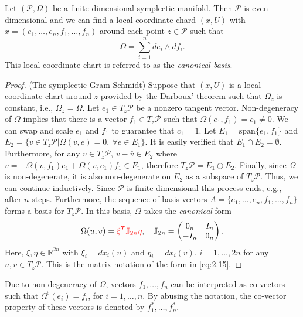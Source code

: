 \begin{corollary} \label{theorem:2.7}
Let $(\mathcal P, \Omega)$ be a finite-dimensional symplectic manifold. Then $\mathcal P$ is even dimensional and we can find a local coordinate chard $(x,U)$ with $x=(e_1,\dots,e_n,f_1,\dots,f_n)$ around each point $z\in \mathcal P$ such that
\begin{equation} \label{eq:2.15}
	\Omega = \sum_{i=1}^{n}de_i\wedge df_i.
\end{equation}
This local coordinate chart is referred to as the \emph{canonical basis}.
\end{corollary}
\begin{proof}
(The symplectic Gram-Schmidt) Suppose that $(x,U)$ is a local coordinate chart around $z$ provided by the Darboux' theorem such that $\Omega_z$ is constant, i.e., $\Omega_z = \Omega$. Let $e_1\in T_z\mathcal P$ be a nonzero tangent vector. Non-degeneracy of $\Omega$ implies that there is a vector $f_1\in T_z\mathcal P$ such that $\Omega(e_1,f_1) = c_1 \neq 0$. We can swap and scale $e_1$ and $f_1$ to guarantee that $c_1 = 1$. Let $E_1 = \text{span}\{e_1,f_1\}$ and $E_2 = \{v\in T_z\mathcal P | \Omega(v,e) = 0,~ \forall e \in E_1\}$. It is easily verified that $E_1\cap E_2 = \emptyset$. Furthermore, for any $v\in T_z\mathcal P$, $v - \bar v \in E_2$ where $\bar v = -\Omega(v,f_1)e_1 + \Omega(v,e_1)f_1 \in E_1$, therefore $T_z\mathcal P = E_1 \oplus E_2$. Finally, since $\Omega$ is non-degenerate, it is also non-degenerate on $E_2$ as a subspace of $T_z\mathcal P$. Thus, we can continue inductively. Since $\mathcal P$ is finite dimensional this process ends, e.g., after $n$ steps. Furthermore, the sequence of basis vectors $A = \{ e_1,\dots,e_n,f_1,\dots,f_n\}$ forms a basis for $T_z\mathcal P$. In this basis, $\Omega$ takes the \emph{canonical} form
\begin{equation} \label{eq:2.141}
	\Omega( u, v) = {\color{red}  \xi^T\mathbb J_{2n}\eta}, \quad \mathbb J_{2n} =
	\begin{pmatrix}
		0_n & I_n \\
		-I_n & 0_n
	\end{pmatrix}.
\end{equation}
Here, $\xi,\eta\in \mathbb R^{2n}$ with $\xi_i = dx_i(u)$ and $\eta_i = dx_i(v)$, $i=1,\dots,2n$ for any $u,v \in T_z\mathcal P$. This is the matrix notation of the form in \eqref{eq:2.15}.
\end{proof}

Due to non-degeneracy of $\Omega$, vectors $f_1,\dots,f_n$ can be interpreted as co-vectors such that $\Omega^{\flat}(e_i)=f_i$, for $i=1,\dots,n$. By abusing the notation, the co-vector property of these vectors is denoted by $f^*_1,\dots,f^*_n$.

